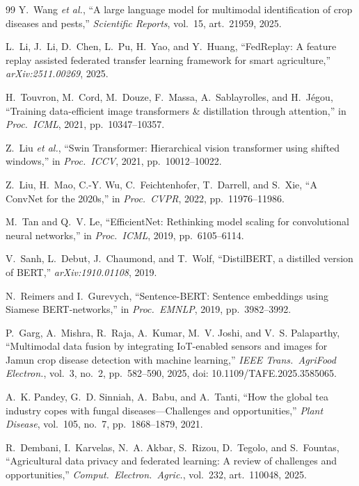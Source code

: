 \documentclass[conference]{IEEEtran}
\begin{document}
\begin{thebibliography}{99}
Y.~Wang \emph{et al.}, ``A large language model for multimodal identification of
crop diseases and pests,'' \emph{Scientific Reports}, vol.~15, art.~21959, 2025.

L.~Li, J.~Li, D.~Chen, L.~Pu, H.~Yao, and Y.~Huang, ``{FedReplay}: A feature
replay assisted federated transfer learning framework for smart agriculture,''
\emph{arXiv:2511.00269}, 2025.

H.~Touvron, M.~Cord, M.~Douze, F.~Massa, A.~Sablayrolles, and H.~J\'{e}gou,
``Training data-efficient image transformers \& distillation through attention,''
in \emph{Proc.\ ICML}, 2021, pp.~10347--10357.

Z.~Liu \emph{et al.}, ``Swin Transformer: Hierarchical vision transformer using
shifted windows,'' in \emph{Proc.\ ICCV}, 2021, pp.~10012--10022.

Z.~Liu, H.~Mao, C.-Y. Wu, C.~Feichtenhofer, T.~Darrell, and S.~Xie, ``A ConvNet for
the 2020s,'' in \emph{Proc.\ CVPR}, 2022, pp.~11976--11986.

M.~Tan and Q.~V. Le, ``EfficientNet: Rethinking model scaling for convolutional
neural networks,'' in \emph{Proc.\ ICML}, 2019, pp.~6105--6114.

V.~Sanh, L.~Debut, J.~Chaumond, and T.~Wolf, ``DistilBERT, a distilled version of
BERT,'' \emph{arXiv:1910.01108}, 2019.

N.~Reimers and I.~Gurevych, ``Sentence-BERT: Sentence embeddings using Siamese
BERT-networks,'' in \emph{Proc.\ EMNLP}, 2019, pp.~3982--3992.

P.~Garg, A.~Mishra, R.~Raja, A.~Kumar, M.~V. Joshi, and V.~S. Palaparthy,
``Multimodal data fusion by integrating IoT-enabled sensors and images for
Jamun crop disease detection with machine learning,'' \emph{IEEE Trans.\
AgriFood Electron.}, vol.~3, no.~2, pp.~582--590, 2025, doi:
10.1109/TAFE.2025.3585065.

A.~K. Pandey, G.~D. Sinniah, A.~Babu, and A.~Tanti, ``How the global tea
industry copes with fungal diseases---Challenges and opportunities,''
\emph{Plant Disease}, vol.~105, no.~7, pp.~1868--1879, 2021.

R.~Dembani, I.~Karvelas, N.~A. Akbar, S.~Rizou, D.~Tegolo, and S.~Fountas,
``Agricultural data privacy and federated learning: A review of challenges
and opportunities,'' \emph{Comput.~Electron.~Agric.}, vol.~232,
art.~110048, 2025.

\end{thebibliography}
\end{document}
